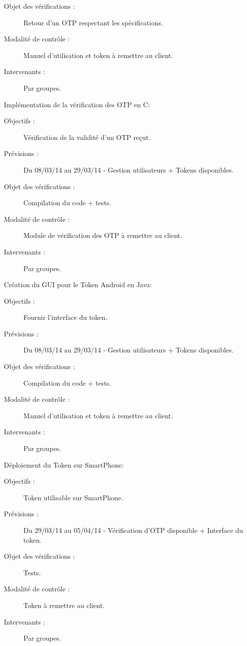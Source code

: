 \documentclass{../../res/univ-projet}
\begin{document}
\begin{description}
\begin{description}
		\item[Objet des vérifications :] Retour d'un OTP respectant les spécifications.
		\item[Modalité de contrôle :] Manuel d'utilisation et token à remettre au client.
		\item[Intervenants :] Par groupes.
	\end{description}
	\vfill
	\item Implémentation de la vérification des OTP en C:
	\begin{description}
		\item[Objectifs :] Vérification de la validité d'un OTP reçut.
		\item[Prévisions :] Du 08/03/14 au 29/03/14 - Gestion utilisateurs + Tokens disponibles.
		\item[Objet des vérifications :] Compilation du code + tests.
		\item[Modalité de contrôle :] Module de vérification des OTP à remettre au client.
		\item[Intervenants :] Par groupes.
	\end{description}
	\vfill
	\item Création du GUI pour le Token Android en Java:
	\begin{description}
		\item[Objectifs :] Fournir l'interface du token.
		\item[Prévisions :] Du 08/03/14 au 29/03/14 - Gestion utilisateurs + Tokens disponibles.
		\item[Objet des vérifications :] Compilation du code + tests.
		\item[Modalité de contrôle :] Manuel d'utilisation et token à remettre au client.
		\item[Intervenants :] Par groupes.
	\end{description}
	\vfill
	\item Déploiement du Token sur SmartPhone:
	\begin{description}
		\item[Objectifs :] Token utilisable sur SmartPhone.
		\item[Prévisions :] Du 29/03/14 au 05/04/14 - Vérification d'OTP disponible + Interface du token.
		\item[Objet des vérifications :] Tests.
		\item[Modalité de contrôle :] Token à remettre au client.
		\item[Intervenants :] Par groupes.
	\end{description}

\end{description}
\end{document}
